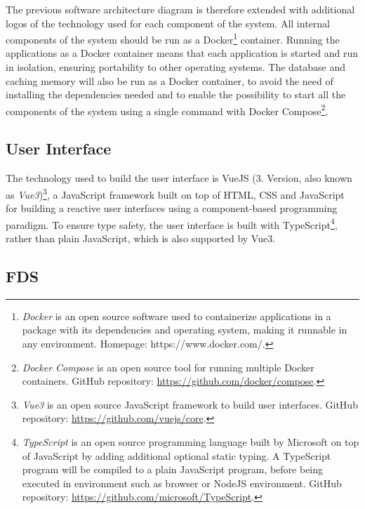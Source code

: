 The previous software architecture diagram is therefore extended with additional logos of the technology used for each component of the system. All internal components of the system should be run as a Docker\footnote{\emph{Docker} is an open source software used to containerize applications in a package with its dependencies and operating system, making it runnable in any environment. Homepage: https://www.docker.com/.} container. Running the applications as a Docker container means that each application is started and run in isolation, ensuring portability to other operating systems. The database and caching memory will also be run as a Docker container, to avoid the need of installing the dependencies needed and to enable the possibility to start all the components of the system using a single command with Docker Compose\footnote{\emph{Docker Compose} is an open source tool for running multiple Docker containers. GitHub repository: \url{https://github.com/docker/compose}.}.

 \subsection{User Interface}
  \label{concept_ui}

 The technology used to build the user interface is VueJS (3. Version, also known as \emph{Vue3})\footnote{\emph{Vue3} is an open source JavaScript framework to build user interfaces. GitHub repository: \url{https://github.com/vuejs/core}.}, a JavaScript framework built on top of HTML, CSS and JavaScript for building a reactive user interfaces using a component-based programming paradigm. To ensure type safety, the user interface is built with TypeScript\footnote{\emph{TypeScript} is an open source programming language built by Microsoft on top of JavaScript by adding additional optional static typing. A TypeScript program will be compiled to a plain JavaScript program, before being executed in environment such as browser or NodeJS environment. GitHub repository: \url{https://github.com/microsoft/TypeScript}.}, rather than plain JavaScript, which is also supported by Vue3.

 \subsection{FDS}
  \label{concept_fds}

